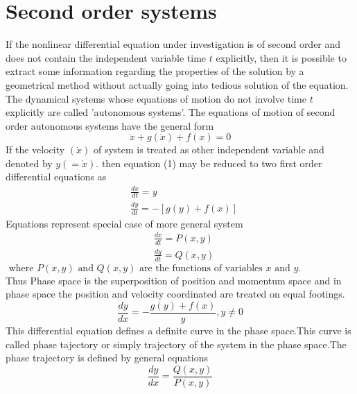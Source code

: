 \section{ Second order systems}
If the nonlinear differential equation under investigation is of second order and does not contain the independent variable time $t$ explicitly, then it is possible to extract some information regarding the properties of the solution by a geometrical method without actually going into tedious solution of the equation. The dynamical systems whose equations of motion do not involve time $t$ explicitly are called 'autonomous systems'. The equations of motion of second order autonomous systems have the general form
$$
\ddot{x}+g(\dot{x})+f(x)=0
$$
If the velocity $(\dot{x})$ of system is treated as other independent variable and denoted by $y(=\dot{x})$. then equation (1) may be reduced to two first order differential equations as\\
$$\begin{aligned}
	&\frac{d x}{d t}=y \\
	&\frac{d y}{d t}=-[g(y)+f(x)]
\end{aligned}$$
 Equations represent special case of more general system \\
 $$\begin{aligned}
 	&\frac{d x}{d t}=P(x, y) \\
 	&\frac{d y}{d t}=Q(x, y)
 \end{aligned}$$
 $\text { where } P(x, y) \text { and } Q(x, y) \text { are the functions of variables } x \text { and } y \text {. }$\\
Thus Phase space is the superposition of position and momentum space and in phase space the position and velocity coordinated are treated on equal footings.\\
$$\frac{dy}{dx}=-\frac{g(y)+f(x)}{y},y\neq0$$
This differential equation defines a definite curve in the phase space.This curve is called phase tajectory or simply trajectory of the system in the phase space.The phase trajectory is defined by general equations\\
$$\frac{dy}{dx}=\frac{Q(x,y)}{P(x,y)}$$
